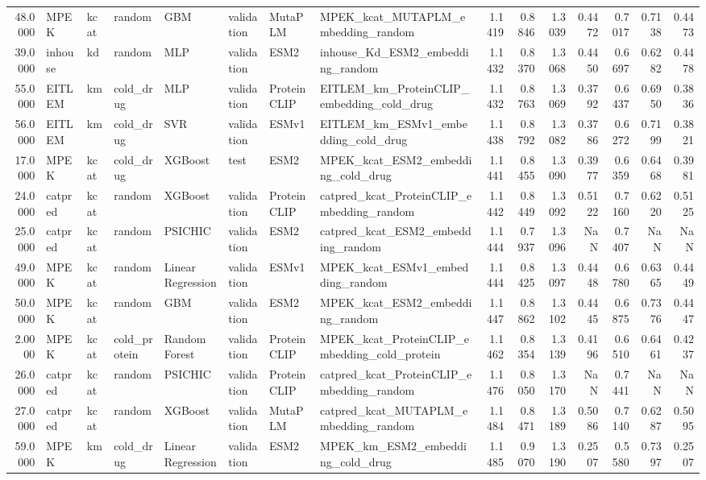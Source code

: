 \begin{tabular}{rlllllllrrrrrrr}
48.0000 & MPEK & kcat & random & GBM & validation & MutaPLM & MPEK_kcat_MUTAPLM_embedding_random & 1.1419 & 0.8846 & 1.3039 & 0.4472 & 0.7017 & 0.7138 & 0.4473 \\
39.0000 & inhouse & kd & random & MLP & validation & ESM2 & inhouse_Kd_ESM2_embedding_random & 1.1432 & 0.8370 & 1.3068 & 0.4450 & 0.6697 & 0.6282 & 0.4478 \\
55.0000 & EITLEM & km & cold_drug & MLP & validation & ProteinCLIP & EITLEM_km_ProteinCLIP_embedding_cold_drug & 1.1432 & 0.8763 & 1.3069 & 0.3792 & 0.6437 & 0.6950 & 0.3836 \\
56.0000 & EITLEM & km & cold_drug & SVR & validation & ESMv1 & EITLEM_km_ESMv1_embedding_cold_drug & 1.1438 & 0.8792 & 1.3082 & 0.3786 & 0.6272 & 0.7199 & 0.3821 \\
17.0000 & MPEK & kcat & cold_drug & XGBoost & test & ESM2 & MPEK_kcat_ESM2_embedding_cold_drug & 1.1441 & 0.8455 & 1.3090 & 0.3977 & 0.6359 & 0.6468 & 0.3981 \\
24.0000 & catpred & kcat & random & XGBoost & validation & ProteinCLIP & catpred_kcat_ProteinCLIP_embedding_random & 1.1442 & 0.8449 & 1.3092 & 0.5122 & 0.7160 & 0.6220 & 0.5125 \\
25.0000 & catpred & kcat & random & PSICHIC & validation & ESM2 & catpred_kcat_ESM2_embedding_random & 1.1444 & 0.7937 & 1.3096 & NaN & 0.7407 & NaN & NaN \\
49.0000 & MPEK & kcat & random & Linear Regression & validation & ESMv1 & MPEK_kcat_ESMv1_embedding_random & 1.1444 & 0.8425 & 1.3097 & 0.4448 & 0.6780 & 0.6365 & 0.4449 \\
50.0000 & MPEK & kcat & random & GBM & validation & ESM2 & MPEK_kcat_ESM2_embedding_random & 1.1447 & 0.8862 & 1.3102 & 0.4445 & 0.6875 & 0.7376 & 0.4447 \\
2.0000 & MPEK & kcat & cold_protein & Random Forest & validation & ProteinCLIP & MPEK_kcat_ProteinCLIP_embedding_cold_protein & 1.1462 & 0.8354 & 1.3139 & 0.4196 & 0.6510 & 0.6461 & 0.4237 \\
26.0000 & catpred & kcat & random & PSICHIC & validation & ProteinCLIP & catpred_kcat_ProteinCLIP_embedding_random & 1.1476 & 0.8050 & 1.3170 & NaN & 0.7441 & NaN & NaN \\
27.0000 & catpred & kcat & random & XGBoost & validation & MutaPLM & catpred_kcat_MUTAPLM_embedding_random & 1.1484 & 0.8471 & 1.3189 & 0.5086 & 0.7140 & 0.6287 & 0.5095 \\
59.0000 & MPEK & km & cold_drug & Linear Regression & validation & ESM2 & MPEK_km_ESM2_embedding_cold_drug & 1.1485 & 0.9070 & 1.3190 & 0.2507 & 0.5580 & 0.7397 & 0.2507 \\

\end{tabular}
